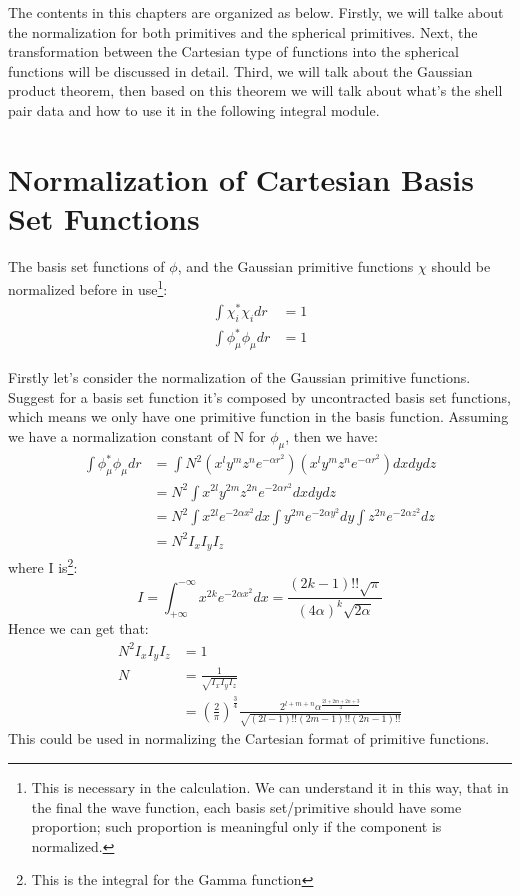 The contents in this chapters are organized as below. Firstly, we will talke about the 
normalization for both primitives and the spherical primitives. Next, the transformation 
between the Cartesian type of functions into the spherical functions will be discussed 
in detail. Third, we will talk about the Gaussian product theorem, then based on this
theorem we will talk about what's the shell pair data and how to use it in the following
integral module.

\section{Normalization of Cartesian Basis Set Functions}
%
%
%
% 
The basis set functions of $\phi$, and the Gaussian primitive functions $\chi$ should be 
normalized before in use\footnote{This is necessary in the calculation. We can understand
it in this way, that in the final the wave function, each basis set/primitive should have
some proportion; such proportion is meaningful only if the component is normalized.}:
\begin{align}
 \label{int_sec2_eq:1}
\int \chi_{i}^{*}\chi_{i} dr &= 1 \nonumber \\
\int \phi_{\mu}^{*}\phi_{\mu} dr &= 1  
\end{align}

Firstly let's consider the normalization of the Gaussian primitive functions.  Suggest 
for a basis set function it's composed by uncontracted basis set functions,
which means we only have one primitive function in the basis function. Assuming we have a 
normalization constant of N for $\phi_{\mu}$, then we have:
\begin{align}
 \label{int_sec2_eq:2}
\int \phi_{\mu}^{*}\phi_{\mu} dr &= 
\int N^{2} (x^{l}y^{m}z^{n}e^{-\alpha r^{2}})(x^{l}y^{m}z^{n}e^{-\alpha r^{2}})
dxdydz \nonumber \\
&= N^{2} \int x^{2l}y^{2m}z^{2n}e^{-2\alpha r^{2}}dxdydz \nonumber \\
&=  N^{2} \int x^{2l}e^{-2\alpha x^{2}}dx\int y^{2m}e^{-2\alpha y^{2}}dy
\int z^{2n}e^{-2\alpha z^{2}}dz \nonumber \\
&=  N^{2} I_{x}I_{y}I_{z}
\end{align}
where I is\footnote{This is the integral for the Gamma function}:
\begin{equation}
 \label{int_sec2_eq:3}
I = \int^{-\infty}_{+\infty} x^{2k}e^{-2\alpha x^{2}}dx = 
\frac{(2k-1)!!\sqrt{\pi}}{(4\alpha)^{k}\sqrt{2\alpha}}
\end{equation}
Hence we can get that:
\begin{align}
 \label{int_sec2_eq:4}
N^{2}I_{x}I_{y}I_{z} &= 1 \nonumber \\
N &= \frac{1}{\sqrt{I_{x}I_{y}I_{z}}}  \nonumber \\
  &= \left( \frac{2}{\pi}\right)^{\frac{3}{4}} 
\frac{2^{l+m+n}\alpha^{\frac{2l+2m+2n+3}{4}}}{\sqrt{(2l-1)!!(2m-1)!!(2n-1)!!}}
\end{align}
This could be used in normalizing the Cartesian format of primitive functions.

